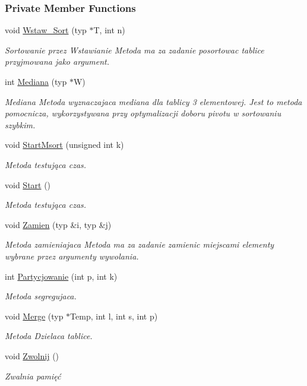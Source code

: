 \subsubsection*{Private Member Functions}
\begin{DoxyCompactItemize}
\item 
void \hyperlink{class_list_arr2x_abc4a5c934e4b30542f71045ec94c176b}{Wstaw\-\_\-\-Sort} (typ $\ast$T, int n)
\begin{DoxyCompactList}\small\item\em Sortowanie przez Wstawianie Metoda ma za zadanie posortowac tablice przyjmowana jako argument. \end{DoxyCompactList}\item 
int \hyperlink{class_list_arr2x_a8f0e72633b7bb63a37faaa99282b5308}{Mediana} (typ $\ast$W)
\begin{DoxyCompactList}\small\item\em Mediana Metoda wyznaczajaca mediana dla tablicy 3 elementowej. Jest to metoda pomocnicza, wykorzystywana przy optymalizacji doboru pivotu w sortowaniu szybkim. \end{DoxyCompactList}\item 
void \hyperlink{class_list_arr2x_adfd1dd69dadd19ac04ede03dba454fb5}{Start\-Msort} (unsigned int k)
\begin{DoxyCompactList}\small\item\em Metoda testująca czas. \end{DoxyCompactList}\item 
void \hyperlink{class_list_arr2x_ad73276a597d78b636119378ee408129d}{Start} ()
\begin{DoxyCompactList}\small\item\em Metoda testująca czas. \end{DoxyCompactList}\item 
void \hyperlink{class_list_arr2x_a8641af35d8316a58610a1c02ff4c3f83}{Zamien} (typ \&i, typ \&j)
\begin{DoxyCompactList}\small\item\em Metoda zamieniajaca Metoda ma za zadanie zamienic miejscami elementy wybrane przez argumenty wywolania. \end{DoxyCompactList}\item 
int \hyperlink{class_list_arr2x_a522da82666b97c2810ff458ef14e0996}{Partycjowanie} (int p, int k)
\begin{DoxyCompactList}\small\item\em Metoda segregujaca. \end{DoxyCompactList}\item 
void \hyperlink{class_list_arr2x_afcf6d8447657ff792afd631c54a4ff99}{Merge} (typ $\ast$Temp, int l, int s, int p)
\begin{DoxyCompactList}\small\item\em Metoda Dzielaca tablice. \end{DoxyCompactList}\item 
void \hyperlink{class_list_arr2x_a4e922603e7ed26334ee19cbca3c5056d}{Zwolnij} ()
\begin{DoxyCompactList}\small\item\em Zwalnia pamięć \end{DoxyCompactList}\end{DoxyCompactItemize}
